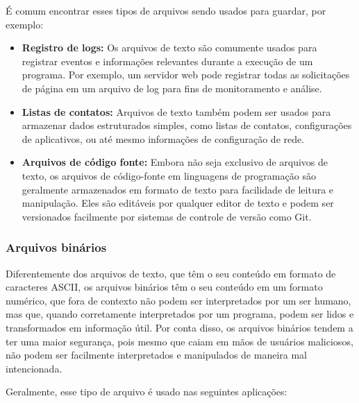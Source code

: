 É comum encontrar esses tipos de arquivos sendo usados para guardar, por exemplo:

\begin{itemize}
        \renewcommand{\labelitemi}{\tiny$\blacksquare$}
    \item \textbf{Registro de logs:} Os arquivos de texto são comumente usados 
        para registrar eventos e informações relevantes durante a execução de 
        um programa. Por exemplo, um servidor web pode registrar todas as 
        solicitações de página em um arquivo de log para fins de monitoramento 
        e análise.
    \item \textbf{Listas de contatos:} Arquivos de texto também podem ser usados 
        para armazenar dados estruturados simples, como listas de contatos, 
        configurações de aplicativos, ou até mesmo informações de configuração 
        de rede.
    \item \textbf{Arquivos de código fonte:} Embora não seja exclusivo de 
        arquivos de texto, os arquivos de código-fonte em linguagens de 
        programação são geralmente armazenados em formato de texto para 
        facilidade de leitura e manipulação. Eles são editáveis por qualquer 
        editor de texto e podem ser versionados facilmente por sistemas de 
        controle de versão como Git.
\end{itemize}

\subsubsection{Arquivos binários}

Diferentemente dos arquivos de texto, que têm o seu conteúdo em formato de 
caracteres ASCII, os arquivos binários têm o seu conteúdo em um formato numérico, 
que fora de contexto não podem ser interpretados por um ser humano, mas que, 
quando corretamente interpretados por um programa, podem ser lidos e 
transformados em informação útil. Por conta disso, os arquivos binários tendem 
a ter uma maior segurança, pois mesmo que caiam em mãos de usuários maliciosos, 
não podem ser facilmente interpretados e manipulados de maneira mal intencionada.

Geralmente, esse tipo de arquivo é usado nas seguintes aplicações:

